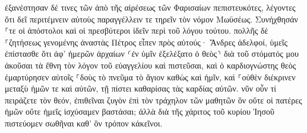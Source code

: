 \documentclass{openreader}
\begin{document}
ἐξανέστησαν δέ τινες τῶν ἀπὸ τῆς αἱρέσεως τῶν Φαρισαίων πεπιστευκότες, λέγοντες ὅτι δεῖ περιτέμνειν αὐτοὺς παραγγέλλειν τε τηρεῖν τὸν νόμον Μωϋσέως. 
Συνήχθησάν ⸀τε οἱ ἀπόστολοι καὶ οἱ πρεσβύτεροι ἰδεῖν περὶ τοῦ λόγου τούτου. 
πολλῆς δὲ ⸀ζητήσεως γενομένης ἀναστὰς Πέτρος εἶπεν πρὸς αὐτούς· Ἄνδρες ἀδελφοί, ὑμεῖς ἐπίστασθε ὅτι ἀφ’ ἡμερῶν ἀρχαίων ⸂ἐν ὑμῖν ἐξελέξατο ὁ θεὸς⸃ διὰ τοῦ στόματός μου ἀκοῦσαι τὰ ἔθνη τὸν λόγον τοῦ εὐαγγελίου καὶ πιστεῦσαι, 
καὶ ὁ καρδιογνώστης θεὸς ἐμαρτύρησεν αὐτοῖς ⸀δοὺς τὸ πνεῦμα τὸ ἅγιον καθὼς καὶ ἡμῖν, 
καὶ ⸀οὐθὲν διέκρινεν μεταξὺ ἡμῶν τε καὶ αὐτῶν, τῇ πίστει καθαρίσας τὰς καρδίας αὐτῶν. 
νῦν οὖν τί πειράζετε τὸν θεόν, ἐπιθεῖναι ζυγὸν ἐπὶ τὸν τράχηλον τῶν μαθητῶν ὃν οὔτε οἱ πατέρες ἡμῶν οὔτε ἡμεῖς ἰσχύσαμεν βαστάσαι; 
ἀλλὰ διὰ τῆς χάριτος τοῦ κυρίου Ἰησοῦ πιστεύομεν σωθῆναι καθ’ ὃν τρόπον κἀκεῖνοι. 
\end{document}
